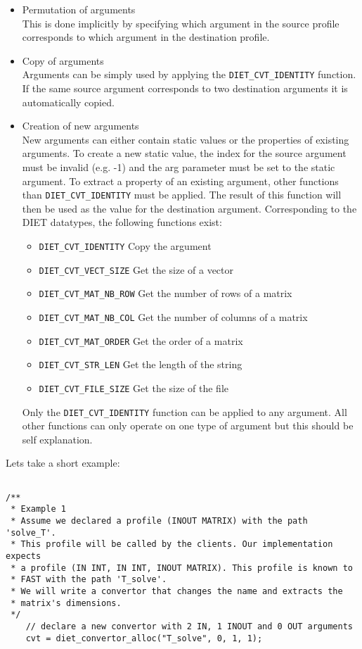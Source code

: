 {{\begin{itemize}
\item Permutation of arguments \\
This is done implicitly by specifying which argument in the source
profile corresponds to which argument in the destination profile.
\item Copy of arguments\\
Arguments can be simply used by applying the \texttt{DIET\_CVT\_IDENTITY}
function. If the same source argument corresponds to two
destination arguments it is automatically copied.
\item Creation of new arguments\\
New arguments can either contain static values or the properties
of existing arguments. To create a new static value, the index for
the source argument must be invalid (e.g. -1) and the arg parameter
must be set to the static argument. To extract a property of an 
existing argument, other functions than \texttt{DIET\_CVT\_IDENTITY} must be
applied. The result of this function will
then be used as the value for the destination argument. Corresponding to
the DIET datatypes, the following functions exist: \\
\begin{itemize}
\item{\texttt{DIET\_CVT\_IDENTITY}} Copy the argument
\item{\texttt{DIET\_CVT\_VECT\_SIZE}} Get the size of a vector
\item{\texttt{DIET\_CVT\_MAT\_NB\_ROW}} Get the number of rows of a matrix
\item{\texttt{DIET\_CVT\_MAT\_NB\_COL}} Get the number of columns of a matrix
\item{\texttt{DIET\_CVT\_MAT\_ORDER}} Get the order of a matrix
\item{\texttt{DIET\_CVT\_STR\_LEN}} Get the length of the string
\item{\texttt{DIET\_CVT\_FILE\_SIZE}} Get the size of the file
\end{itemize}
Only the \texttt{DIET\_CVT\_IDENTITY} function can be applied to any argument.
All other functions can only operate on one type of argument but this
should be self explanation.

\end{itemize}

\noindent Lets take a short example:
\footnotesize
\begin{verbatim}

/**
 * Example 1
 * Assume we declared a profile (INOUT MATRIX) with the path 'solve_T'.
 * This profile will be called by the clients. Our implementation expects
 * a profile (IN INT, IN INT, INOUT MATRIX). This profile is known to
 * FAST with the path 'T_solve'.
 * We will write a convertor that changes the name and extracts the 
 * matrix's dimensions.
 */
    // declare a new convertor with 2 IN, 1 INOUT and 0 OUT arguments
    cvt = diet_convertor_alloc("T_solve", 0, 1, 1);


\end{verbatim}}}
